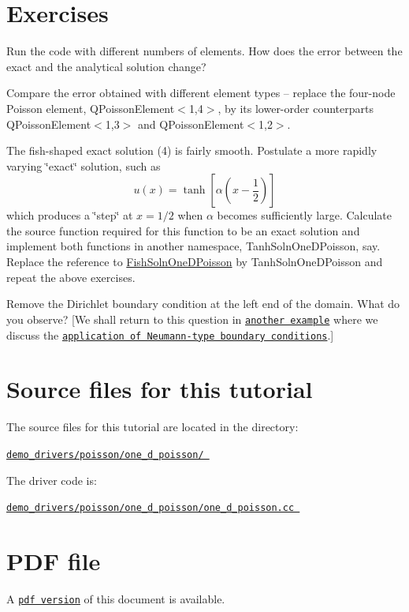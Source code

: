  

\hypertarget{index_exercises}{}\section{Exercises}\label{index_exercises}

\begin{DoxyEnumerate}
\item Run the code with different numbers of elements. How does the error between the exact and the analytical solution change?
\item Compare the error obtained with different element types -- replace the four-\/node Poisson element, {\ttfamily Q\+Poisson\+Element$<$1,4$>$}, by its lower-\/order counterparts {\ttfamily Q\+Poisson\+Element$<$1,3$>$} and {\ttfamily Q\+Poisson\+Element$<$1,2$>$}.
\item The fish-\/shaped exact solution (4) is fairly smooth. Postulate a more rapidly varying \char`\"{}exact\char`\"{} solution, such as \[ u(x) = \tanh\left[\alpha \left(x-\frac{1}{2}\right)\right] \] which produces a \char`\"{}step\char`\"{} at $ x=1/2 $ when $ \alpha $ becomes sufficiently large. Calculate the source function required for this function to be an exact solution and implement both functions in another namespace, {\ttfamily Tanh\+Soln\+One\+D\+Poisson}, say. Replace the reference to {\ttfamily \hyperlink{namespaceFishSolnOneDPoisson}{Fish\+Soln\+One\+D\+Poisson}} by {\ttfamily Tanh\+Soln\+One\+D\+Poisson} and repeat the above exercises.
\item Remove the Dirichlet boundary condition at the left end of the domain. What do you observe? \mbox{[}We shall return to this question in \href{../../../poisson/two_d_poisson_flux_bc/html/index.html}{\tt another example} where we discuss the \href{../../../poisson/two_d_poisson_flux_bc/html/index.html}{\tt application of Neumann-\/type boundary conditions}.\mbox{]}
\end{DoxyEnumerate}



 

\hypertarget{index_sources}{}\section{Source files for this tutorial}\label{index_sources}

\begin{DoxyItemize}
\item The source files for this tutorial are located in the directory\+: \begin{center} \href{../../../../demo_drivers/poisson/one_d_poisson/}{\tt demo\+\_\+drivers/poisson/one\+\_\+d\+\_\+poisson/ } \end{center} 
\item The driver code is\+: \begin{center} \href{../../../../demo_drivers/poisson/one_d_poisson/one_d_poisson.cc}{\tt demo\+\_\+drivers/poisson/one\+\_\+d\+\_\+poisson/one\+\_\+d\+\_\+poisson.\+cc } \end{center} 
\end{DoxyItemize}

 

 \hypertarget{index_pdf}{}\section{P\+D\+F file}\label{index_pdf}
A \href{../latex/refman.pdf}{\tt pdf version} of this document is available. 
